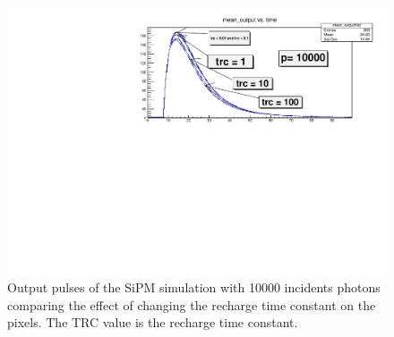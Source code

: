 \begin{figure}
\centering
\includegraphics[width=\linewidth]{Figures/p10000trc.pdf}
\caption{Output pulses of the SiPM simulation with 10000 incidents photons comparing the effect of changing the recharge time constant on the pixels. The TRC value is the recharge time constant.}
\label{fig:trc}
\end{figure}

